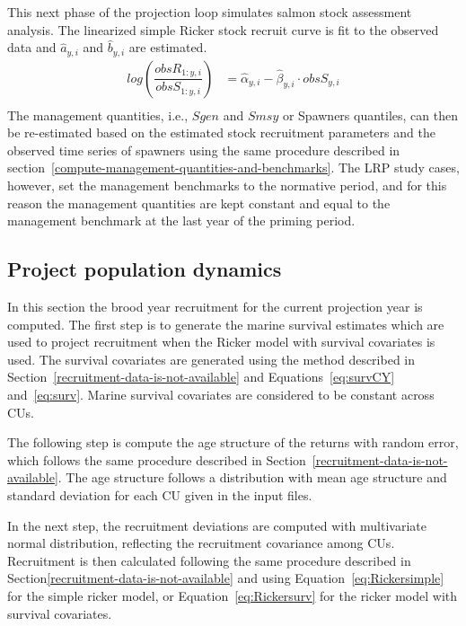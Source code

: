 \documentclass[11pt]{book}
\begin{document}
This next phase of the projection loop simulates salmon stock assessment analysis. The linearized simple Ricker stock recruit curve is fit to the observed data and \(\hat{a}_{y,i}\) and \(\hat{b}_{y,i}\) are estimated.
\begin{align}
  log \left( \dfrac{obsR_{1:y,i}}{obsS_{1:y,i}}\right) &= \hat{\alpha}_{y,i}-\hat{\beta}_{y,i} \cdot  obsS_{y,i}\\
  \label{eq:obslogRS}
\end{align}
The management quantities, i.e., \(Sgen\) and \(Smsy\) or Spawners quantiles, can then be re-estimated based on the estimated stock recruitment parameters and the observed time series of spawners using the same procedure described in section~\ref{compute-management-quantities-and-benchmarks}. The LRP study cases, however, set the management benchmarks to the normative period, and for this reason the management quantities are kept constant and equal to the management benchmark at the last year of the priming period.

\hypertarget{project-population-dynamics}{%
\subsection{Project population dynamics}\label{project-population-dynamics}}

In this section the brood year recruitment for the current projection year is computed. The first step is to generate the marine survival estimates which are used to project recruitment when the Ricker model with survival covariates is used. The survival covariates are generated using the method described in Section~\ref{recruitment-data-is-not-available} and Equations~\ref{eq:survCY} and~\ref{eq:surv}. Marine survival covariates are considered to be constant across CUs.

The following step is compute the age structure of the returns with random error, which follows the same procedure described in Section~\ref{recruitment-data-is-not-available}. The age structure follows a distribution with mean age structure and standard deviation for each CU given in the input files.

In the next step, the recruitment deviations are computed with multivariate normal distribution, reflecting the recruitment covariance among CUs. Recruitment is then calculated following the same procedure described in Section\ref{recruitment-data-is-not-available} and using Equation~\ref{eq:Rickersimple} for the simple ricker model, or Equation~\ref{eq:Rickersurv} for the ricker model with survival covariates.
\end{document}
